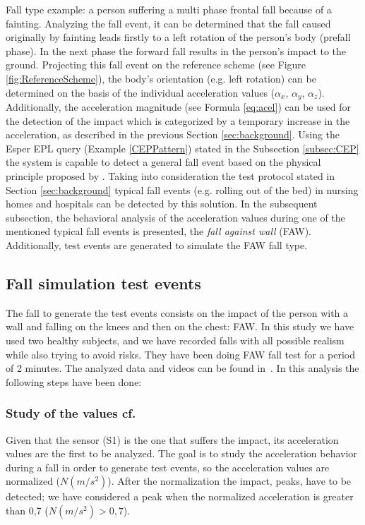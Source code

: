 \documentclass[10pt,journal,compsoc]{IEEEtran}
\begin{document}
Fall type example: a person suffering a multi phase frontal fall because of a fainting. Analyzing the fall event, it can be determined that the fall caused originally by fainting leads firstly to a left rotation of the person's body (prefall phase). In  the next phase the forward fall results in the person’s impact
to the ground. Projecting this fall event on the reference scheme (see Figure \ref{fig:ReferenceScheme}), the body's orientation (e.g. left rotation) can be determined on the basis of the individual acceleration values ($\alpha_x$,  $\alpha_y$,  $\alpha_z$). Additionally, the acceleration magnitude (see Formula \ref{eq:acel}) can be used for the detection of the impact which is categorized by a temporary increase in the acceleration, as described in the previous Section \ref{sec:background}. Using the Esper EPL query (Example \ref{CEPPattern}) stated in the Subsection \ref{subsec:CEP} the system is capable to detect a general fall event based on the physical principle proposed by \cite{Kozina}.
Taking into consideration the test protocol stated in Section \ref{sec:background} typical fall events (e.g. rolling out of the bed) in nursing homes and hospitals can be detected by this solution. In the subsequent subsection, the behavioral analysis of the acceleration values during one of the mentioned typical fall events is presented, the \textit{fall against wall} (FAW). Additionally, test events are generated to simulate the FAW fall type.

\subsection{Fall simulation test events}

The fall to generate the test events consists on the impact of the person with 
a wall and falling on the knees and then on the chest: FAW. 
In this study we have used two healthy subjects, and we have recorded falls with all 
possible realism while also trying to avoid risks. They have been doing FAW fall test for a period 
of 2 minutes. The analyzed data and videos can be found in~\cite{FallRepo}.
In this analysis the following steps have been done:

\subsubsection{Study of the values cf.\cite{LorenaFall}} Given that the sensor (S1) is the one that suffers the 
impact, its acceleration values are the first to be analyzed. The goal is to study 
the acceleration behavior during a fall in order to generate test events, so the acceleration 
values are normalized ($N(m/s^2)$). After the normalization the impact, peaks, 
have to be detected; we have considered a peak when the normalized acceleration is 
greater than 0,7 ($N(m/s^2) > 0,7$). 
\end{document}
